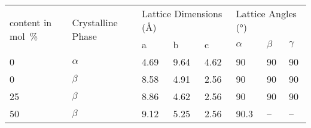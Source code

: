 \begin{tabular}{@{}l l l l l l l l@{}}
\toprule
\multirow{2}{*}{\parbox[c]{2.5cm}{\trfe{} content in \si{\mole\percent}}} & \multirow{2}{*}{\parbox[c]{2.5cm}{Crystalline Phase}} & \multicolumn{3}{l}{Lattice Dimensions (\si{\angstrom})} & \multicolumn{3}{l}{Lattice Angles (\si{\degree})} \\ \cmidrule(l){3-8} 
                                                       &                                    & a                 & b                 & c                & $\alpha$        & $\beta$        & $\gamma$       \\ \midrule
0                                                      & $\alpha$                           & 4.69              & 9.64              & 4.62             & 90              & 90             & 90             \\
0                                                      & $\beta$                            & 8.58              & 4.91              & 2.56             & 90              & 90             & 90             \\
25                                                     & $\beta$                            & 8.86              & 4.62              & 2.56             & 90              & 90             & 90             \\
50                                                     & $\beta$                            & 9.12              & 5.25              & 2.56             & 90.3            & --             & --             \\ \bottomrule
\end{tabular}